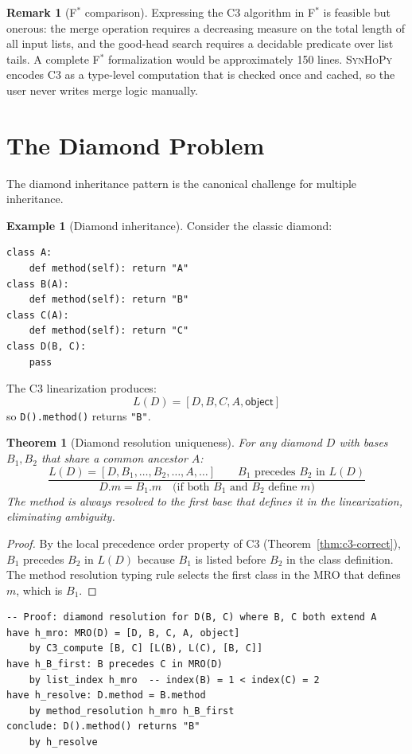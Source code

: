 \documentclass[11pt,a4paper]{report}
\theoremstyle{definition}
\newtheorem{example}[definition]{Example}
\newtheorem{remark}[definition]{Remark}
\theoremstyle{plain}
\newtheorem{theorem}[definition]{Theorem}
\newcommand{\fstar}{F$^{*}$}
\newcommand{\synhopy}{\textsc{SynHoPy}}
\begin{document}
\begin{remark}[\fstar{} comparison]
Expressing the C3 algorithm in \fstar{} is feasible but onerous: the merge
operation requires a decreasing measure on the total length of all input
lists, and the good-head search requires a decidable predicate over list tails.
A complete \fstar{} formalization would be approximately 150 lines.
\synhopy{} encodes C3 as a type-level computation that is checked once
and cached, so the user never writes merge logic manually.
\end{remark}

\section{The Diamond Problem}

The diamond inheritance pattern is the canonical challenge for multiple
inheritance.

\begin{example}[Diamond inheritance]
\label{ex:diamond}
Consider the classic diamond:
\begin{lstlisting}[style=python]
class A:
    def method(self): return "A"
class B(A):
    def method(self): return "B"
class C(A):
    def method(self): return "C"
class D(B, C):
    pass
\end{lstlisting}
The C3 linearization produces:
\[
  L(D) = [D, B, C, A, \mathsf{object}]
\]
so \lstinline[style=python]{D().method()} returns \texttt{"B"}.
\end{example}

\begin{theorem}[Diamond resolution uniqueness]
\label{thm:diamond-unique}
For any diamond $D$ with bases $B_1, B_2$ that share a common ancestor $A$:
\[
  \frac{
    L(D) = [D, B_1, \ldots, B_2, \ldots, A, \ldots] \qquad
    B_1 \text{ precedes } B_2 \text{ in } L(D)
  }{
    D.m = B_1.m \quad \text{(if both $B_1$ and $B_2$ define $m$)}
  }
\]
The method is always resolved to the \emph{first} base that defines it in the
linearization, eliminating ambiguity.
\end{theorem}
\begin{proof}
By the local precedence order property of C3 (Theorem~\ref{thm:c3-correct}),
$B_1$ precedes $B_2$ in $L(D)$ because $B_1$ is listed before $B_2$ in the
class definition.  The method resolution typing rule selects the first class
in the MRO that defines $m$, which is $B_1$.
\end{proof}

\begin{lstlisting}[style=proof]
-- Proof: diamond resolution for D(B, C) where B, C both extend A
have h_mro: MRO(D) = [D, B, C, A, object]
    by C3_compute [B, C] [L(B), L(C), [B, C]]
have h_B_first: B precedes C in MRO(D)
    by list_index h_mro  -- index(B) = 1 < index(C) = 2
have h_resolve: D.method = B.method
    by method_resolution h_mro h_B_first
conclude: D().method() returns "B"
    by h_resolve
\end{lstlisting}
\end{document}
